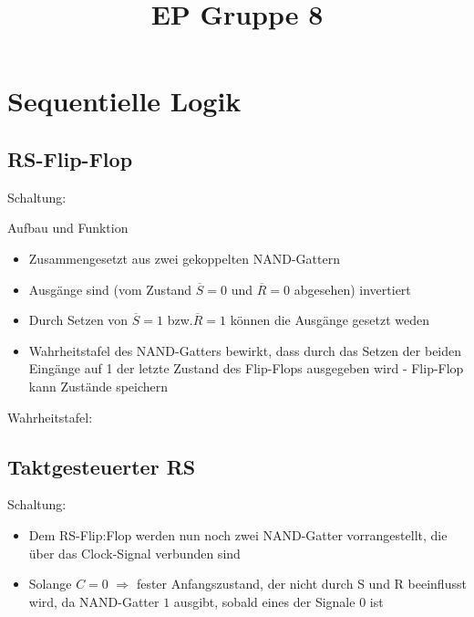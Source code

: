 \documentclass[compress,11pt]{beamer}
\title{EP Gruppe 8}
\begin{document}
\section{Sequentielle Logik}
\subsection{RS-Flip-Flop}
\begin{frame}
Schaltung:





\end{frame}
\begin{frame}

\begin{block}{Aufbau und Funktion}
\begin{itemize}
\item Zusammengesetzt aus zwei gekoppelten NAND-Gattern
\item Ausgänge sind (vom Zustand $\overline{S} = 0$ und $\overline{R} = 0$ abgesehen) invertiert
\item Durch Setzen von $\overline{S} = 1$ bzw.$\overline{R} = 1$ können die Ausgänge gesetzt weden
\item Wahrheitstafel des NAND-Gatters bewirkt, dass durch das Setzen der beiden Eingänge auf 1 der letzte Zustand des Flip-Flops ausgegeben wird - Flip-Flop kann Zustände speichern
\end{itemize}
\end{block}
\end{frame}

\begin{frame}
Wahrheitstafel:\\





\end{frame}
\subsection{Taktgesteuerter RS}
\begin{frame}
Schaltung:\\




\end{frame}
\begin{frame}
\begin{block}
\begin{itemize}
\item Dem RS-Flip:Flop werden nun noch zwei NAND-Gatter vorrangestellt, die über das Clock-Signal verbunden sind
\item Solange $C = 0$ $\Rightarrow$ fester Anfangszustand, der nicht durch S und R beeinflusst wird, da NAND-Gatter $1$ ausgibt, sobald eines der Signale $0$ ist

\end{itemize}
\end{block}
\end{frame}
\begin{frame}

\end{frame}
\end{document}
